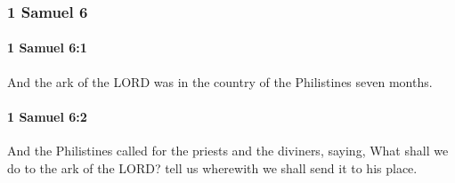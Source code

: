 	\subsubsection{1 Samuel 6} %
		\label{1SAMUEL-6}

		\paragraph{1 Samuel 6:1} %
			\label{1SAMUEL-6-1}

			And the ark of the LORD was in the country of the Philistines seven months.


		\paragraph{1 Samuel 6:2} %
			\label{1SAMUEL-6-2}

			And the Philistines called for the priests and the diviners, saying, What shall we do to the ark of the LORD? tell us wherewith we shall send it to his place.


